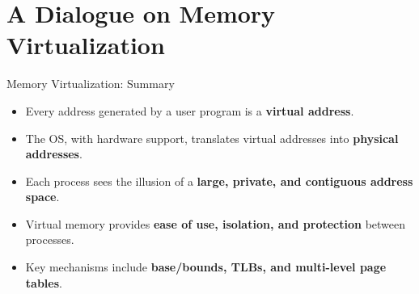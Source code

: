 \section{A Dialogue on Memory Virtualization}

\begin{frame}{Memory Virtualization: Summary}
    \begin{itemize}
        \item Every address generated by a user program is a
              \textbf{virtual address}.
        \item The OS, with hardware support, translates virtual addresses
              into \textbf{physical addresses}.
        \item Each process sees the illusion of a \textbf{large, private,
              and contiguous address space}.
        \item Virtual memory provides \textbf{ease of use, isolation,
              and protection} between processes.
        \item Key mechanisms include \textbf{base/bounds, TLBs,
              and multi-level page tables}.
    \end{itemize}
\end{frame}